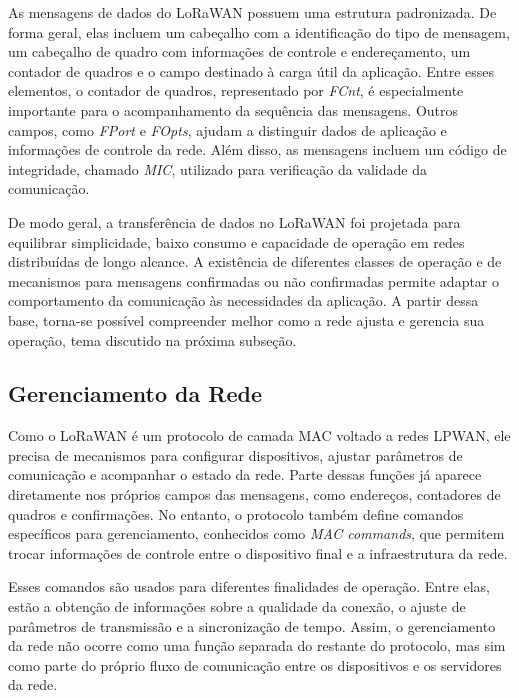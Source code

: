 As mensagens de dados do LoRaWAN possuem uma estrutura padronizada. De forma geral, elas incluem um cabeçalho com a identificação do tipo de mensagem, um cabeçalho de quadro com informações de controle e endereçamento, um contador de quadros e o campo destinado à carga útil da aplicação. Entre esses elementos, o contador de quadros, representado por \textit{FCnt}, é especialmente importante para o acompanhamento da sequência das mensagens. Outros campos, como \textit{FPort} e \textit{FOpts}, ajudam a distinguir dados de aplicação e informações de controle da rede. Além disso, as mensagens incluem um código de integridade, chamado \textit{MIC}, utilizado para verificação da validade da comunicação.

De modo geral, a transferência de dados no LoRaWAN foi projetada para equilibrar simplicidade, baixo consumo e capacidade de operação em redes distribuídas de longo alcance. A existência de diferentes classes de operação e de mecanismos para mensagens confirmadas ou não confirmadas permite adaptar o comportamento da comunicação às necessidades da aplicação. A partir dessa base, torna-se possível compreender melhor como a rede ajusta e gerencia sua operação, tema discutido na próxima subseção.


\subsection{Gerenciamento da Rede}

Como o LoRaWAN é um protocolo de camada MAC voltado a redes LPWAN, ele precisa de mecanismos para configurar dispositivos, ajustar parâmetros de comunicação e acompanhar o estado da rede. Parte dessas funções já aparece diretamente nos próprios campos das mensagens, como endereços, contadores de quadros e confirmações. No entanto, o protocolo também define comandos específicos para gerenciamento, conhecidos como \textit{MAC commands}, que permitem trocar informações de controle entre o dispositivo final e a infraestrutura da rede. \cite{hessel2023lorawan}

Esses comandos são usados para diferentes finalidades de operação. Entre elas, estão a obtenção de informações sobre a qualidade da conexão, o ajuste de parâmetros de transmissão e a sincronização de tempo. Assim, o gerenciamento da rede não ocorre como uma função separada do restante do protocolo, mas sim como parte do próprio fluxo de comunicação entre os dispositivos e os servidores da rede. 


